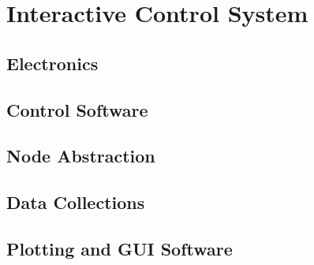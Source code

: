 \chapter{Interactive Control System}
\section{Electronics}

\section{Control Software}

\section{Node Abstraction}

\section{Data Collections}

\section{Plotting and GUI Software}
